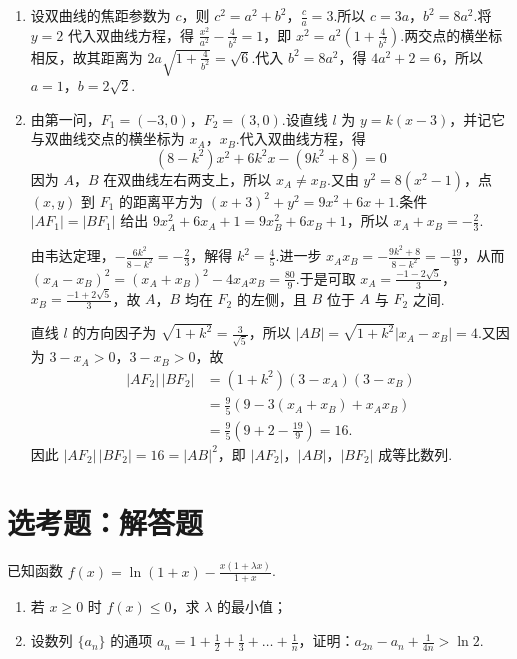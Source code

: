 \begin{solution}
\begin{enumerate}
\item 设双曲线的焦距参数为 \(c\)，则 \(c^2=a^2+b^2\)，\(\frac{c}{a}=3\).所以 \(c=3a\)，\(b^2=8a^2\).将 \(y=2\) 代入双曲线方程，得 \(\frac{x^2}{a^2}-\frac{4}{b^2}=1\)，即 \(x^2=a^2\left(1+\frac{4}{b^2}\right)\).两交点的横坐标相反，故其距离为 \(2a\sqrt{1+\frac{4}{b^2}}=\sqrt6\).代入 \(b^2=8a^2\)，得 \(4a^2+2=6\)，所以 \(a=1\)，\(b=2\sqrt2\).
\item 由第一问，\(F_1=(-3,0)\)，\(F_2=(3,0)\).设直线 \(l\) 为 \(y=k(x-3)\)，并记它与双曲线交点的横坐标为 \(x_A\)，\(x_B\).代入双曲线方程，得
\[
(8-k^2)x^2+6k^2x-(9k^2+8)=0
\]
因为 \(A\)，\(B\) 在双曲线左右两支上，所以 \(x_A\ne x_B\).又由 \(y^2=8(x^2-1)\)，点 \((x,y)\) 到 \(F_1\) 的距离平方为 \((x+3)^2+y^2=9x^2+6x+1\).条件 \(|AF_1|=|BF_1|\) 给出 \(9x_A^2+6x_A+1=9x_B^2+6x_B+1\)，所以 \(x_A+x_B=-\frac23\).

由韦达定理，\(-\frac{6k^2}{8-k^2}=-\frac23\)，解得 \(k^2=\frac45\).进一步 \(x_Ax_B=-\frac{9k^2+8}{8-k^2}=-\frac{19}{9}\)，从而 \((x_A-x_B)^2=(x_A+x_B)^2-4x_Ax_B=\frac{80}{9}\).于是可取 \(x_A=\frac{-1-2\sqrt5}{3}\)，\(x_B=\frac{-1+2\sqrt5}{3}\)，故 \(A\)，\(B\) 均在 \(F_2\) 的左侧，且 \(B\) 位于 \(A\) 与 \(F_2\) 之间.

直线 \(l\) 的方向因子为 \(\sqrt{1+k^2}=\frac{3}{\sqrt5}\)，所以 \(|AB|=\sqrt{1+k^2}|x_A-x_B|=4\).又因为 \(3-x_A>0\)，\(3-x_B>0\)，故
\[
\begin{aligned}
|AF_2|\,|BF_2|
&=(1+k^2)(3-x_A)(3-x_B)\\
&=\frac95\left(9-3(x_A+x_B)+x_Ax_B\right)\\
&=\frac95\left(9+2-\frac{19}{9}\right)=16.
\end{aligned}
\]
因此 \(|AF_2|\,|BF_2|=16=|AB|^2\)，即 \(|AF_2|\)，\(|AB|\)，\(|BF_2|\) 成等比数列.
\end{enumerate}
\end{solution}

\section{选考题：解答题}

\begin{problem}
已知函数 \(f(x)=\ln\left(1+x\right)-\frac{x(1+\lambda x)}{1+x}\).

\begin{enumerate}
\item 若 \(x\geqslant0\) 时 \(f(x)\leqslant0\)，求 \(\lambda\) 的最小值；
\item 设数列 \(\{a_n\}\) 的通项 \(a_n=1+\frac{1}{2}+\frac{1}{3}+\dots+\frac{1}{n}\)，证明：\(a_{2n}-a_n+\frac{1}{4n}>\ln2\).
\end{enumerate}
\end{problem}

